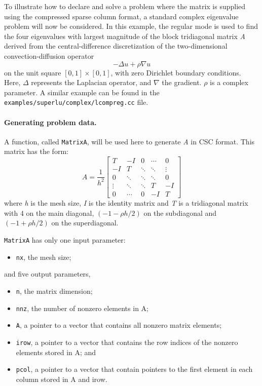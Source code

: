 To illustrate how to declare and solve a problem where the matrix is supplied using the compressed sparse column format, a standard complex eigenvalue problem will now be considered. In this example, the regular mode is used to find the four eigenvalues with largest magnitude of the block tridiagonal matrix \textit{A} derived from the central-difference discretization of the two-dimensional convection-diffusion operator 
\[-\Delta u+\rho \nabla u\] 
on the unit square $[0,1]\times [0,1]$, with zero Dirichlet boundary conditions. Here, $\Delta $ represents the Laplacian operator, and $\nabla $ the gradient. $\rho $ is a complex parameter. A similar example can be found in the \texttt{examples/superlu/complex/lcompreg.cc} file.

\paragraph{Generating problem data.}

A function, called \texttt{MatrixA}, will be used here to generate \textit{A} in CSC format. This matrix has the form: 
\[A=\frac{1}{h^{2} } \left[\begin{array}{ccccc} {T} & {-I} & {0} & {\cdots } & {0} \\ {-I} & {T} & {\ddots } & {\ddots } & {\vdots } \\ {0} & {\ddots } & {\ddots } & {\ddots } & {0} \\ {\vdots } & {\ddots } & {\ddots } & {T} & {-I} \\ {0} & {\cdots } & {0} & {-I} & {T} \end{array}\right]\] 
where \textit{h} is the mesh size, \textit{I} is the identity matrix and \textit{T} is a tridiagonal matrix with 4 on the main diagonal, $(-1-\rho h/2)$ on the subdiagonal and $(-1+\rho h/2)$ on the superdiagonal.

\texttt{MatrixA} has only one input parameter:
\begin{itemize}
	\item \texttt{nx}, the mesh size;
\end{itemize}
and five output parameters, 
\begin{itemize}
	\item \texttt{n}, the matrix dimension;
	\item \texttt{nnz}, the number of nonzero elements in A;
	\item \texttt{A}, a pointer to a vector that contains all nonzero matrix elements;
	\item \texttt{irow}, a pointer to a vector that contains the row indices of the nonzero elements stored in A; and
	\item \texttt{pcol}, a pointer to a vector that contain pointers to the first element in each column stored in A and irow.
\end{itemize}

